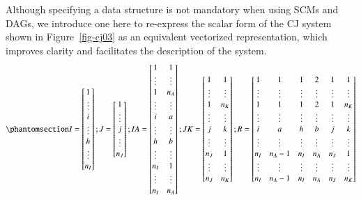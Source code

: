 \documentclass[
  authoryear,
  review,
  1p]{elsarticle}
\begin{document}
Although specifying a data structure is not mandatory when using SCMs
and DAGs, we introduce one here to re-express the scalar form of the CJ
system shown in Figure~\ref{fig-cj03} as an equivalent vectorized
representation, which improves clarity and facilitates the description
of the system. \begin{equation}\protect\phantomsection\label{eq-mat11}{
I = \begin{bmatrix}
1 \\
\vdots \\
i \\
\vdots \\
h \\
\vdots \\
n_{I}
\end{bmatrix};
J = \begin{bmatrix}
1 \\
\vdots \\
j \\
\vdots \\
n_{J}
\end{bmatrix};
IA = \begin{bmatrix}
1 & 1 \\
\vdots & \vdots \\
1 & n_{A} \\
\vdots & \vdots \\
i & a \\
\vdots & \vdots \\
h & b \\
\vdots & \vdots \\
n_{I} & 1 \\
\vdots & \vdots \\
n_{I} & n_{A}
\end{bmatrix};
JK = \begin{bmatrix}
1 & 1 \\
\vdots & \vdots \\
1 & n_{K} \\
\vdots & \vdots \\
j & k \\
\vdots & \vdots \\
n_{J} & 1 \\
\vdots & \vdots \\
n_{J} & n_{K}
\end{bmatrix};
R = \begin{bmatrix}
1 & 1 & 1 & 2 & 1 & 1 \\
\vdots & \vdots & \vdots & \vdots & \vdots & \vdots\\
1 & 1 & 1 & 2 & 1 & n_{K} \\
\vdots & \vdots & \vdots & \vdots & \vdots & \vdots\\
i & a & h & b & j & k \\
\vdots & \vdots & \vdots & \vdots & \vdots & \vdots\\
n_{I} & n_{A}-1 & n_{I} & n_{A} & n_{J} & 1 \\
\vdots & \vdots & \vdots & \vdots & \vdots & \vdots\\
n_{I} & n_{A}-1 & n_{I} & n_{A} & n_{J} & n_{K}
\end{bmatrix}
}\end{equation}
\end{document}
